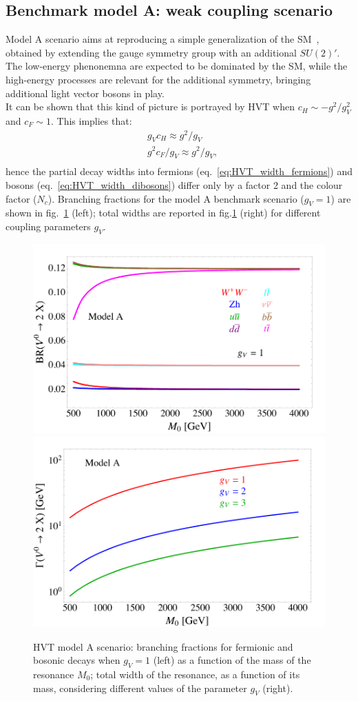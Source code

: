 \subsection{Benchmark model A: weak coupling scenario}
\label{sec:theory_HVT_A}
Model A scenario aims at reproducing a simple generalization of the SM~\cite{Barger:1980ix}, obtained by extending the gauge symmetry group with an additional $SU(2)'$. The low-energy phenonemna are expected to be dominated by the SM, while the high-energy processes are relevant for the additional symmetry, bringing additional light vector bosons in play.\\
It can be shown that this kind of picture is portrayed by HVT when $c_H \sim -g^2/g_V^2$ and $c_F \sim 1$. This implies that:
\begin{equation}
\begin{split}
 & g_V c_H \approx g^2/g_V\\
 & g^2 c_F/g_V \approx g^2/g_V,\\
\end{split}
\label{eq:theory_HVT_modelA}
\end{equation}
hence the partial decay widths into fermions (eq.~\ref{eq:HVT_width_fermions}) and bosons (eq.~\ref{eq:HVT_width_dibosons}) differ only by a factor 2 and the colour factor ($N_c$). Branching fractions for the model A benchmark scenario ($g_V =1$) are shown in fig.~\ref{fig:HVT_modelA_BR_width} (left); total widths are reported in fig.\ref{fig:HVT_modelA_BR_width} (right) for different coupling parameters $g_V$.  

\begin{figure}[!htb]
  \centering
    \includegraphics[width=.495\textwidth]{figures/Figures_BRWC.png}%
    \includegraphics[width=.495\textwidth]{figures/Figures_WidthWC.png}
  \caption{HVT model A scenario: branching fractions for fermionic and bosonic decays when $g_V = 1$ (left) as a function of the mass of the resonance $M_0$; total width of the resonance, as a function of its mass, considering different values of the parameter $g_V$ (right).}
  \label{fig:HVT_modelA_BR_width}
\end{figure}

